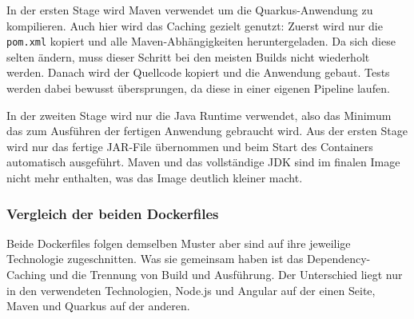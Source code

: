 In der ersten Stage wird Maven verwendet um die Quarkus-Anwendung 
zu kompilieren. Auch hier wird das Caching gezielt genutzt: Zuerst 
wird nur die \texttt{pom.xml} kopiert und alle Maven-Abhängigkeiten 
heruntergeladen. Da sich diese selten ändern, muss dieser Schritt 
bei den meisten Builds nicht wiederholt werden. Danach wird der 
Quellcode kopiert und die Anwendung gebaut. Tests werden dabei 
bewusst übersprungen, da diese in einer eigenen Pipeline laufen.

In der zweiten Stage wird nur die Java Runtime verwendet, also 
das Minimum das zum Ausführen der fertigen Anwendung gebraucht 
wird. Aus der ersten Stage wird nur das fertige JAR-File 
übernommen und beim Start des Containers automatisch ausgeführt. 
Maven und das vollständige JDK sind im finalen Image nicht mehr 
enthalten, was das Image deutlich kleiner macht.

\subsubsection{Vergleich der beiden Dockerfiles}

Beide Dockerfiles folgen demselben Muster aber sind auf ihre 
jeweilige Technologie zugeschnitten. Was sie gemeinsam haben 
ist das Dependency-Caching und die Trennung von Build und 
Ausführung. Der Unterschied liegt nur in den verwendeten 
Technologien, Node.js und Angular auf der einen Seite, 
Maven und Quarkus auf der anderen.